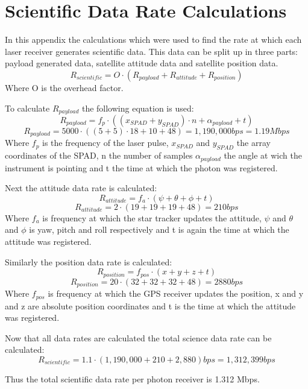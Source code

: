 \chapter{Scientific Data Rate Calculations}
\label{scirate}
In this appendix the calculations which were used to find the rate at which each laser receiver generates scientific data.
This data can be split up in three parts: payload generated data, satellite attitude data and satellite position data.
\begin{equation}
R_{scientific}=O\cdot (R_{payload}+ R_{attitude} + R_{position})
\end{equation}
Where O is the overhead factor.

To calculate $R_{payload}$ the following equation is used:
\begin{equation}
R_{payload}=f_{p} \cdot ((x_{SPAD}+y_{SPAD})\cdot n+ \alpha_{payload}+t)
\end{equation}
\begin{equation}
R_{payload}=5000 \cdot ((5+5)\cdot 18+10+48)=1,190,000 bps=1.19 Mbps 
\end{equation}
Where $f_{p}$ is the frequency of the laser pulse, $x_{SPAD}$ and $y_{SPAD}$ the array coordinates of the SPAD, n the number of samples $\alpha_{payload}$ the angle at wich the instrument is pointing and t the time at which the photon was registered.

Next the attitude data rate is calculated:
\begin{equation}
R_{attitude}=f_{a} \cdot (\psi + \theta + \phi +t)
\end{equation}
\begin{equation}
R_{attitude}=2 \cdot (19+19+19+48)=210 bps 
\end{equation}
Where $f_{a}$ is frequency at which the star tracker updates the attitude, $\psi$ and $\theta$ and $\phi$ is yaw, pitch and roll respectively and t is again the time at which the attitude was registered.

Similarly the position data rate is calculated:
\begin{equation}
R_{position}=f_{pos} \cdot (x + y + z +t)
\end{equation}
\begin{equation}
R_{position}=20 \cdot (32+32+32+48)=2880 bps 
\end{equation}
Where $f_{pos}$ is frequency at which the GPS receiver updates the position, x and y and z are absolute position coordinates and t is the time at which the attitude was registered.

Now that all data rates are calculated the total science data rate can be calculated:
\begin{equation}
R_{scientific}=1.1\cdot (1,190,000 + 210 + 2,880) bps= 1,312,399 bps
\end{equation}

Thus the total scientific data rate per photon receiver is 1.312 Mbps.